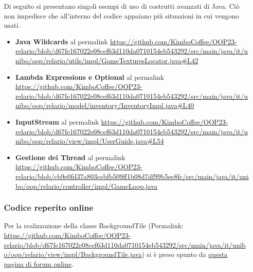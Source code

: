 \documentclass[a4paper,12pt]{report}
\begin{document}
Di seguito si presentano singoli esempi di uso di costrutti avanzati di Java. Ciò non impedisce che all'interno del codice appaiano più situazioni in cui vengono usati.
\begin{itemize}
	\item \textbf{Java Wildcards} al permalink \url{https://github.com/KimboCoffee/OOP23-relario/blob/d67fe167022e08cef63d110da0710154eb543292/src/main/java/it/unibo/oop/relario/utils/impl/GameTexturesLocator.java#L42}
	\item \textbf{Lambda Expressions e Optional} al permalink \url{https://github.com/KimboCoffee/OOP23-relario/blob/d67fe167022e08cef63d110da0710154eb543292/src/main/java/it/unibo/oop/relario/model/inventory/InventoryImpl.java#L40}
	\item \textbf{InputStream} al permalink \url{https://github.com/KimboCoffee/OOP23-relario/blob/d67fe167022e08cef63d110da0710154eb543292/src/main/java/it/unibo/oop/relario/view/impl/UserGuide.java#L54}
	\item \textbf{Gestione dei Thread} al permalink \url{https://github.com/KimboCoffee/OOP23-relario/blob/cb9e0fd37a803cebfb509ff1b08d7df99b5ee8fc/src/main/java/it/unibo/oop/relario/controller/impl/GameLoop.java}
\end{itemize}

\subsubsection{Codice reperito online}
Per la realizzazione della classe BackgroundTile (Permalink:  \url{https://github.com/KimboCoffee/OOP23-relario/blob/d67fe167022e08cef63d110da0710154eb543292/src/main/java/it/unibo/oop/relario/view/impl/BackgroundTile.java}) si è preso spunto da \href{https://coderanch.com/t/336043/java/Images-top}{questa pagina di forum online}.
\end{document}

